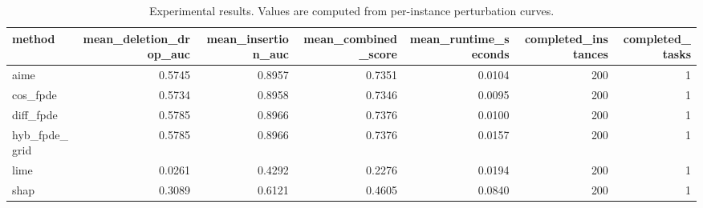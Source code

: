 \begin{table}[t]
\caption{Experimental results. Values are computed from per-instance perturbation curves.}
\label{tab:main_results_computed}
\centering
\begin{tabular}{lrrrrrr}
\toprule
method & mean\_deletion\_drop\_auc & mean\_insertion\_auc & mean\_combined\_score & mean\_runtime\_seconds & completed\_instances & completed\_tasks \\
\midrule
aime & 0.5745 & 0.8957 & 0.7351 & 0.0104 & 200 & 1 \\
cos\_fpde & 0.5734 & 0.8958 & 0.7346 & 0.0095 & 200 & 1 \\
diff\_fpde & 0.5785 & 0.8966 & 0.7376 & 0.0100 & 200 & 1 \\
hyb\_fpde\_grid & 0.5785 & 0.8966 & 0.7376 & 0.0157 & 200 & 1 \\
lime & 0.0261 & 0.4292 & 0.2276 & 0.0194 & 200 & 1 \\
shap & 0.3089 & 0.6121 & 0.4605 & 0.0840 & 200 & 1 \\
\bottomrule
\end{tabular}

\end{table}
